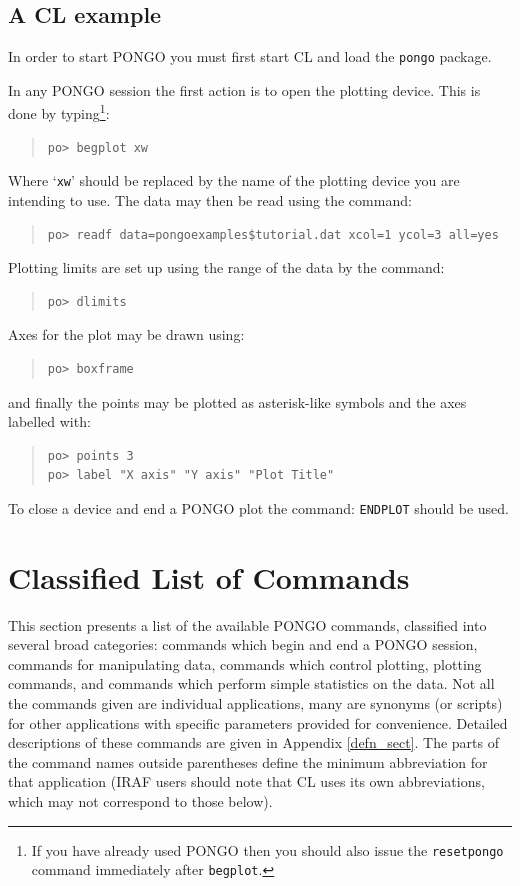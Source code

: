 \documentclass[twoside,11pt]{article}
\newcommand{\htmlref}[2]{#1}
\renewcommand{\_}{\texttt{\symbol{95}}}
\newcommand{\cnam}[1]{{\tt #1}}
\newcommand{\iref} [1]{\htmlref{#1}{#1}}
\begin{document}
\subsection{A CL example}

In order to start PONGO you must first start CL and load the
\verb+pongo+ package.

In any PONGO session the first action is to open the plotting device.
This is done by typing\footnote{ If you have already used PONGO then
you should also issue the \cnam{\iref{resetpongo}} command immediately
after \cnam{\iref{begplot}}.}:
\begin{quote}
\begin{verbatim}
po> begplot xw
\end{verbatim}
\end{quote}
Where `\verb+xw+' should be replaced by the name of the plotting device you
are intending to use. The data may then be read using the command:
\begin{quote}
\begin{verbatim}
po> readf data=pongoexamples$tutorial.dat xcol=1 ycol=3 all=yes
\end{verbatim}
\end{quote}
Plotting limits are set up using the range of the data by the command:
\begin{quote}
\begin{verbatim}
po> dlimits
\end{verbatim}
\end{quote}
Axes for the plot may be drawn using:
\begin{quote}
\begin{verbatim}
po> boxframe
\end{verbatim}
\end{quote}
and finally the points may be plotted as asterisk-like symbols and the axes
labelled with:
\begin{quote}
\begin{verbatim}
po> points 3
po> label "X axis" "Y axis" "Plot Title"
\end{verbatim}
\end{quote}
To close a device and end a PONGO plot the command:
\cnam{\iref{ENDPLOT}} should be used.

\section{Classified List of Commands}

This section presents a list of the available PONGO commands,
classified into several broad categories: commands which begin and end
a PONGO session, commands for manipulating data, commands which
control plotting, plotting commands, and commands which perform simple
statistics on the data.  Not all the commands given are individual
applications, many are synonyms (or scripts) for other applications
with specific parameters provided for convenience.  Detailed
descriptions of these commands are given in Appendix \ref{defn_sect}.
The parts of the command names outside parentheses define the minimum
abbreviation for that application (IRAF users should note that CL uses
its own abbreviations, which may not correspond to those below).
\end{document}
